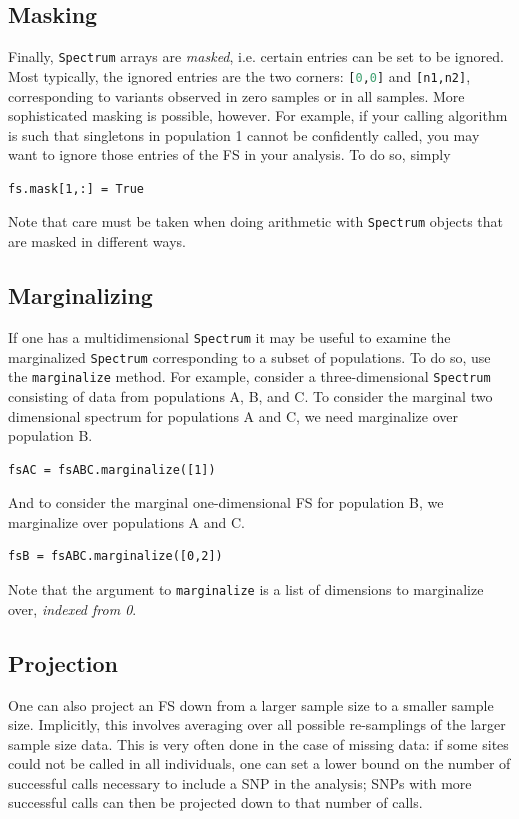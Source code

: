 \documentclass[12pt]{article}
\makeatletter
\newcommand{\py}[1]{\lstinline[language=Python, showstringspaces=False]@#1@}
\makeatother
\begin{document}
\subsection{Masking}

Finally, \py{Spectrum} arrays are \emph{masked}, i.e. certain entries can be set to be ignored.
Most typically, the ignored entries are the two corners: \py{[0,0]} and \py{[n1,n2]}, corresponding to variants observed in zero samples or in all samples.
More sophisticated masking is possible, however.
For example, if your calling algorithm is such that singletons in population 1 cannot be confidently called, you may want to ignore those entries of the FS in your analysis.
To do so, simply
\begin{lstlisting}
fs.mask[1,:] = True
\end{lstlisting}
Note that care must be taken when doing arithmetic with \py{Spectrum} objects that are masked in different ways.

\subsection{Marginalizing}

If one has a multidimensional \py{Spectrum} it may be useful to examine the marginalized \py{Spectrum} corresponding to a subset of populations.
To do so, use the \py{marginalize} method.
For example, consider a three-dimensional \py{Spectrum} consisting of data from populations A, B, and C.
To consider the marginal two dimensional spectrum for populations A and C, we need marginalize over population B.
\begin{lstlisting}
fsAC = fsABC.marginalize([1])
\end{lstlisting}
And to consider the marginal one-dimensional FS for population B, we marginalize over populations A and C.
\begin{lstlisting}
fsB = fsABC.marginalize([0,2])
\end{lstlisting}
Note that the argument to \py{marginalize} is a list of dimensions to marginalize over, \emph{indexed from 0}.

\subsection{Projection}

One can also project an FS down from a larger sample size to a smaller sample size.
Implicitly, this involves averaging over all possible re-samplings of the larger sample size data.
This is very often done in the case of missing data: if some sites could not be called in all individuals, one can set a lower bound on the number of successful calls necessary to include a SNP in the analysis; SNPs with more successful calls can then be projected down to that number of calls.
\end{document}
